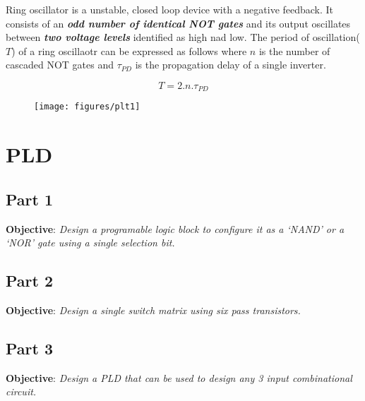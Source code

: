 \documentclass[a4paper,11pt]{article}%
\begin{document}
Ring oscillator is a unstable, closed loop device with a negative feedback. It consists of an \textbf{\textit{odd number of identical NOT gates}} and its output oscillates between\textbf{\textit{ two voltage levels}} identified as high nad low. The period of oscillation($T$) of a ring oscillaotr can be expressed as follows where $n$ is the number of cascaded NOT gates and $\tau_{PD}$ is the propagation delay of a single inverter.

\[
T = 2.n.\tau_{PD}
\]

\begin{figure}[!h]
\centering
\texttt{[image: figures/plt1]}

\end{figure}


\pagebreak
\section{PLD}
\subsection{Part 1}
\textbf{Objective}: \textit{Design a programable logic block to configure it as a `NAND' or a `NOR' gate using a single selection bit.}\\

\subsection{Part 2}
\textbf{Objective}: \textit{Design a single switch matrix using six pass transistors.}\\

\subsection{Part 3}
\textbf{Objective}: \textit{Design a PLD that can be used to design any 3 input
combinational circuit.}\\


%
%

\end{document}
